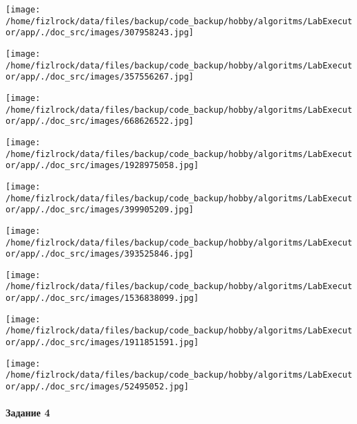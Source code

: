 \documentclass[a4paper, 12pt]{article}
\begin{document}
\texttt{[image: /home/fizlrock/data/files/backup/code\_backup/hobby/algoritms/LabExecutor/app/./doc\_src/images/307958243.jpg]}

\texttt{[image: /home/fizlrock/data/files/backup/code\_backup/hobby/algoritms/LabExecutor/app/./doc\_src/images/357556267.jpg]}

\texttt{[image: /home/fizlrock/data/files/backup/code\_backup/hobby/algoritms/LabExecutor/app/./doc\_src/images/668626522.jpg]}

\texttt{[image: /home/fizlrock/data/files/backup/code\_backup/hobby/algoritms/LabExecutor/app/./doc\_src/images/1928975058.jpg]}

\texttt{[image: /home/fizlrock/data/files/backup/code\_backup/hobby/algoritms/LabExecutor/app/./doc\_src/images/399905209.jpg]}

\texttt{[image: /home/fizlrock/data/files/backup/code\_backup/hobby/algoritms/LabExecutor/app/./doc\_src/images/393525846.jpg]}

\texttt{[image: /home/fizlrock/data/files/backup/code\_backup/hobby/algoritms/LabExecutor/app/./doc\_src/images/1536838099.jpg]}

\texttt{[image: /home/fizlrock/data/files/backup/code\_backup/hobby/algoritms/LabExecutor/app/./doc\_src/images/1911851591.jpg]}

\texttt{[image: /home/fizlrock/data/files/backup/code\_backup/hobby/algoritms/LabExecutor/app/./doc\_src/images/52495052.jpg]}
\pagebreak
\paragraph{Задание 4}
\end{document}
